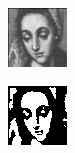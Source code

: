 \begin{minipage}{0.5\linewidth}
	\centering
	\includegraphics[width=0.9\linewidth]{./Experiments/Average/fig/Input.png} 
\end{minipage}
\begin{minipage}{0.5\linewidth}
	\centering
	\includegraphics[width=0.9\linewidth]{./Experiments/Average/fig/Output.png}
\end{minipage}
